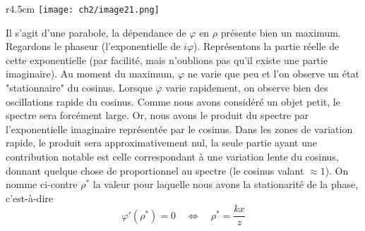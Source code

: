 	\begin{wrapfigure}[15]{r}{4.5cm}
	\vspace{-3mm}
	\texttt{[image: ch2/image21.png]}
	\end{wrapfigure}
	Il s'agit d'une parabole, la dépendance de $\varphi$ en $\rho$ présente bien un 
	maximum. Regardons le phaseur (l'exponentielle de $i\varphi$). Représentons la 
	partie réelle de cette exponentielle (par facilité, mais n'oublions pas qu'il 
	existe une partie imaginaire). Au moment du maximum, $\varphi$ ne varie que peu 
	et l'on observe un état "stationnaire" du cosinus. Lorsque $\varphi$ varie 
	rapidement, on observe bien des oscillations rapide du cosinus. Comme nous avons 
	considéré un objet petit, le spectre sera forcément large. Or, nous avons le 
	produit du spectre par l'exponentielle imaginaire représentée par le cosinus. Dans 
	les zones de variation rapide, le produit sera approximativement nul, la seule 
	partie ayant une contribution notable est celle correspondant à une variation 
	lente du cosinus, donnant quelque chose de proportionnel au spectre (le cosinus 
	valant $\approx 1$). On nomme ci-contre $\rho^*$ la valeur pour laquelle nous 
	avons la stationarité de la phase, c'est-à-dire
	\begin{equation}
	\varphi'(\rho^*)=0\quad \Leftrightarrow\quad \rho^* = \dfrac{kx}{z}
	\end{equation}
	\newpage
	
